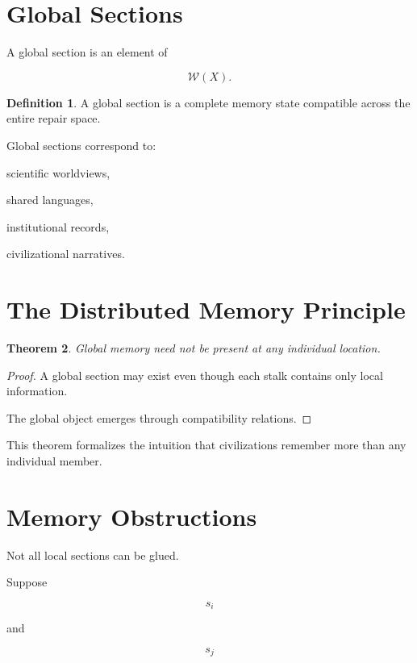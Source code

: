 \documentclass[12pt,oneside]{book}
\theoremstyle{plain} \newtheorem{theorem}{Theorem}[chapter] \newtheorem{lemma}[theorem]{Lemma} \newtheorem{proposition}[theorem]{Proposition} \newtheorem{corollary}[theorem]{Corollary}
\theoremstyle{definition} \newtheorem{definition}[theorem]{Definition} \newtheorem{axiom}[theorem]{Axiom} \newtheorem{construction}[theorem]{Construction}
\theoremstyle{remark} \newtheorem{remark}[theorem]{Remark} \newtheorem{example}[theorem]{Example}
\begin{document}
\section{Global Sections}

A global section is an element of

\[
\mathcal W(X).
\]

\begin{definition}

A global section is a complete memory state compatible across the entire repair space.

\end{definition}

Global sections correspond to:

scientific worldviews,

shared languages,

institutional records,

civilizational narratives.

\section{The Distributed Memory Principle}

\begin{theorem}

Global memory need not be present at any individual location.

\end{theorem}

\begin{proof}

A global section may exist even though each stalk contains only local information.

The global object emerges through compatibility relations.

\end{proof}

This theorem formalizes the intuition that civilizations remember more than any individual member.

\section{Memory Obstructions}

Not all local sections can be glued.

Suppose

\[
s_i
\]

and

\[
s_j
\]
\end{document}
